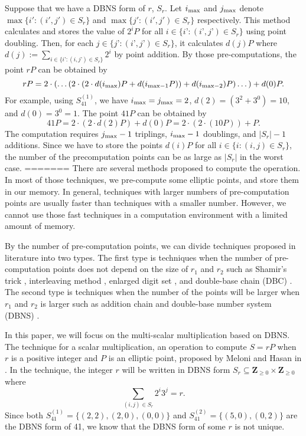 Suppose that we have a DBNS form of $r$, $S_r$. Let $i_{\rm max}$ and $j_{\rm max}$ denote $\max\{ i' : (i',j') \in S_r \}$ and $\max\{ j' : (i',j') \in S_r \}$ respectively.
This method calculates and stores the value of $2^iP$ for all $i \in \{i’ : (i’, j’) \in S_r \}$ using point doubling.
Then, for each $j \in \{j’ : (i’, j’) \in S_r \}$, it calculates $d(j)P$ where $d(j) := \sum\limits_{i \in \{i’ : (i,j’) \in S_r\}} 2^i $ by point addition.
By those pre-computations, the point $rP$ can be obtained by
$$rP = 2\cdot \left( \dots \left( 2 \cdot \left( 2 \cdot d(i_{\rm max})P + d(i_{\mathrm{max} - 1}P) \right) + d(i_{\mathrm{max} - 2})P \right) \dots \right) + d(0)P.$$
For example, using $S_{41}^{(1)}$, we have $i_{\rm max} = j_{\rm max} = 2$, $d(2) = \left(3^2 + 3^0\right) = 10$, and $d(0) =  3^0 = 1$. The point $41P$ can be obtained by
$$41P = 2 \cdot \left( 2 \cdot d(2)P  \right) + d(0)P = 2 \cdot \left( 2 \cdot \left( 10P \right)  \right) + P.$$
The computation requires $j_{\rm max} - 1$ triplings, $i_{\rm max} - 1$ doublings, and $|S_r| - 1$ additions.
Since we have to store the points $d(i)P$ for all $i \in \{i : (i,j) \in S_r\}$, the number of the precomputation points can be as large as $|S_r|$ in the worst case.
=======
There are several methods proposed to compute the operation. In most of those techniques, we pre-compute some elliptic points, and store them in our memory. In general, techniques with larger numbers of pre-computation points are usually faster than techniques with a smaller number. However, we cannot use those fast techniques in a computation environment with a limited amount of memory. 

By the number of pre-computation points, we can divide techniques proposed in literature into two types. The first type is techniques when the number of pre-computation points does not depend on the size of $r_1$ and $r_2$ such as Shamir’s trick \cite{Shamir}, interleaving method \cite{interleaving}, enlarged digit set \cite{enlarged2,enlarged4,enlarged1,enlarged3}, and double-base chain (DBC) \cite{dbc2,dbc3,dbc1}. The second type is techniques when the number of the points will be larger when $r_1$ and $r_2$ is larger such as addition chain \cite{additionChain1,additionChain2} and double-base number system (DBNS)  \cite{dbns}.

In this paper, we will focus on the multi-scalar multiplication based on DBNS. The technique for a scalar multiplication, an operation to compute $S = rP$ when $r$ is a positive integer and $P$ is an elliptic point, proposed by Meloni and Hasan in \cite{dbns}.  In the technique, the integer $r$ will be written in DBNS form $S_r \subseteq \mathbf{Z}_{\geq 0} \times \mathbf{Z}_{\geq 0}$ where
$$\sum_{(i,j) \in S_r} 2^i 3^j = r.$$ 
Since both $S^{(1)}_{41} = \{(2,2), (2,0), (0,0)\}$ and $S^{(2)}_{41} = \{(5,0), (0,2)\}$ are the DBNS form of 41, we know that the DBNS form of some $r$ is not unique.


